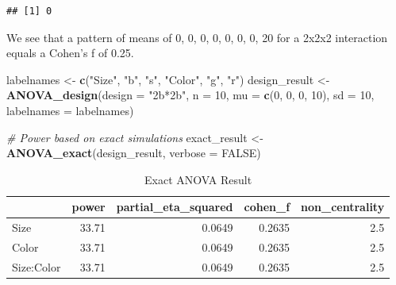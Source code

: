 \documentclass[]{book}
\newenvironment{Shaded}{\begin{snugshade}}{\end{snugshade}}
\newcommand{\CommentTok}[1]{\textcolor[rgb]{0.56,0.35,0.01}{\textit{#1}}}
\newcommand{\DataTypeTok}[1]{\textcolor[rgb]{0.13,0.29,0.53}{#1}}
\newcommand{\DecValTok}[1]{\textcolor[rgb]{0.00,0.00,0.81}{#1}}
\newcommand{\KeywordTok}[1]{\textcolor[rgb]{0.13,0.29,0.53}{\textbf{#1}}}
\newcommand{\NormalTok}[1]{#1}
\newcommand{\OperatorTok}[1]{\textcolor[rgb]{0.81,0.36,0.00}{\textbf{#1}}}
\newcommand{\OtherTok}[1]{\textcolor[rgb]{0.56,0.35,0.01}{#1}}
\newcommand{\StringTok}[1]{\textcolor[rgb]{0.31,0.60,0.02}{#1}}
\begin{document}
\begin{verbatim}
## [1] 0
\end{verbatim}

We see that a pattern of means of 0, 0, 0, 0, 0, 0, 0, 20 for a 2x2x2 interaction equals a Cohen's f of 0.25.

\begin{Shaded}
\begin{Highlighting}[]
\NormalTok{labelnames <-}\StringTok{ }\KeywordTok{c}\NormalTok{(}\StringTok{"Size"}\NormalTok{, }\StringTok{"b"}\NormalTok{, }\StringTok{"s"}\NormalTok{, }\StringTok{"Color"}\NormalTok{, }\StringTok{"g"}\NormalTok{, }\StringTok{"r"}\NormalTok{)}
\NormalTok{design_result <-}\StringTok{ }\KeywordTok{ANOVA_design}\NormalTok{(}\DataTypeTok{design =} \StringTok{"2b*2b"}\NormalTok{, }
                              \DataTypeTok{n =} \DecValTok{10}\NormalTok{, }
                              \DataTypeTok{mu =} \KeywordTok{c}\NormalTok{(}\DecValTok{0}\NormalTok{, }\DecValTok{0}\NormalTok{, }\DecValTok{0}\NormalTok{, }\DecValTok{10}\NormalTok{), }
                              \DataTypeTok{sd =} \DecValTok{10}\NormalTok{, }
                              \DataTypeTok{labelnames =}\NormalTok{ labelnames) }

\CommentTok{# Power based on exact simulations}
\NormalTok{exact_result <-}\StringTok{ }\KeywordTok{ANOVA_exact}\NormalTok{(design_result,}
                            \DataTypeTok{verbose =} \OtherTok{FALSE}\NormalTok{)}
\end{Highlighting}
\end{Shaded}

\begin{table}[t]

\caption{\label{tab:unnamed-chunk-198}Exact ANOVA Result}
\centering
\begin{tabular}{l|r|r|r|r}
\hline
  & power & partial\_eta\_squared & cohen\_f & non\_centrality\\
\hline
Size & 33.71 & 0.0649 & 0.2635 & 2.5\\
\hline
Color & 33.71 & 0.0649 & 0.2635 & 2.5\\
\hline
Size:Color & 33.71 & 0.0649 & 0.2635 & 2.5\\
\hline
\end{tabular}
\end{table}

\begin{Shaded}
\end{Shaded}
\end{document}
